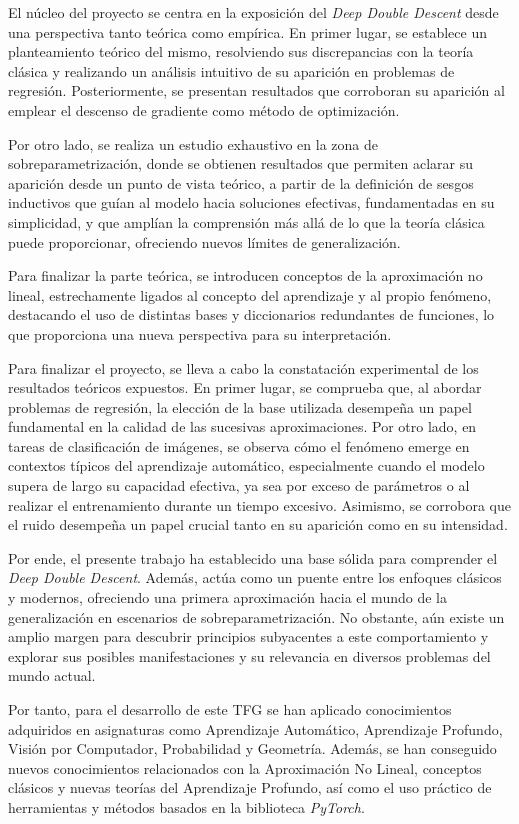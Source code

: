 El núcleo del proyecto se centra en la exposición del \textit{Deep Double Descent} desde una perspectiva tanto teórica como empírica. En primer lugar, se establece un planteamiento teórico del mismo, resolviendo sus discrepancias con la teoría clásica y realizando un análisis intuitivo de su aparición en problemas de regresión. Posteriormente, se presentan resultados que corroboran su aparición al emplear el descenso de gradiente como método de optimización. 

Por otro lado, se realiza un estudio exhaustivo en la zona de sobreparametrización, donde se obtienen resultados que permiten aclarar su aparición desde un punto de vista teórico, a partir de la definición de sesgos inductivos que guían al modelo hacia soluciones efectivas, fundamentadas en su simplicidad, y que amplían la comprensión más allá de lo que la teoría clásica puede proporcionar, ofreciendo nuevos límites de generalización.

Para finalizar la parte teórica, se introducen conceptos de la aproximación no lineal, estrechamente ligados al concepto del aprendizaje y al propio fenómeno, destacando el uso de distintas bases y diccionarios redundantes de funciones, lo que proporciona una nueva perspectiva para su interpretación.

Para finalizar el proyecto, se lleva a cabo la constatación experimental de los resultados teóricos expuestos. En primer lugar, se comprueba que, al abordar problemas de regresión, la elección de la base utilizada desempeña un papel fundamental en la calidad de las sucesivas aproximaciones. Por otro lado, en tareas de clasificación de imágenes, se observa cómo el fenómeno emerge en contextos típicos del aprendizaje automático, especialmente cuando el modelo supera de largo su capacidad efectiva, ya sea por exceso de parámetros o al realizar el entrenamiento durante un tiempo excesivo. Asimismo, se corrobora que el ruido desempeña un papel crucial tanto en su aparición como en su intensidad.

Por ende, el presente trabajo ha establecido una base sólida para comprender el \textit{Deep Double Descent}. Además, actúa como un puente entre los enfoques clásicos y modernos, ofreciendo una primera aproximación hacia el mundo de la generalización en escenarios de sobreparametrización. No obstante, aún existe un amplio margen para descubrir principios subyacentes a este comportamiento y explorar sus posibles manifestaciones y su relevancia en diversos problemas del mundo actual.

Por tanto, para el desarrollo de este TFG se han aplicado conocimientos adquiridos en asignaturas como Aprendizaje Automático, Aprendizaje Profundo, Visión por Computador, Probabilidad y Geometría. Además, se han conseguido nuevos conocimientos relacionados con la Aproximación No Lineal, conceptos clásicos y nuevas teorías del Aprendizaje Profundo, así como el uso práctico de herramientas y métodos basados en la biblioteca \textit{PyTorch}.

